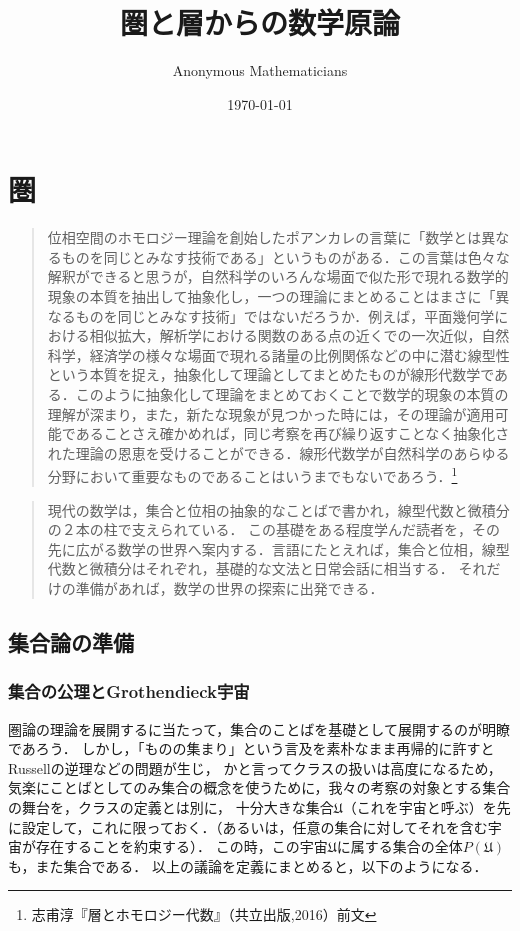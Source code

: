\documentclass[uplatex, dvipdfmx]{jsreport}
\title{圏と層からの数学原論}
\author{Anonymous Mathematicians}
\date{\today}
\begin{document}
\tableofcontents

\part{圏}

\begin{quotation}
    位相空間のホモロジー理論を創始したポアンカレの言葉に「数学とは異なるものを同じとみなす技術である」というものがある．この言葉は色々な解釈ができると思うが，自然科学のいろんな場面で似た形で現れる数学的現象の本質を抽出して抽象化し，一つの理論にまとめることはまさに「異なるものを同じとみなす技術」ではないだろうか．例えば，平面幾何学における相似拡大，解析学における関数のある点の近くでの一次近似，自然科学，経済学の様々な場面で現れる諸量の比例関係などの中に潜む線型性という本質を捉え，抽象化して理論としてまとめたものが線形代数学である．このように抽象化して理論をまとめておくことで数学的現象の本質の理解が深まり，また，新たな現象が見つかった時には，その理論が適用可能であることさえ確かめれば，同じ考察を再び繰り返すことなく抽象化された理論の恩恵を受けることができる．線形代数学が自然科学のあらゆる分野において重要なものであることはいうまでもないであろう．\footnote{志甫淳『層とホモロジー代数』（共立出版,2016）前文}
\end{quotation}
\begin{quotation}
    現代の数学は，集合と位相の抽象的なことばで書かれ，線型代数と微積分の２本の柱で支えられている．
    この基礎をある程度学んだ読者を，その先に広がる数学の世界へ案内する．言語にたとえれば，集合と位相，線型代数と微積分はそれぞれ，基礎的な文法と日常会話に相当する．
    それだけの準備があれば，数学の世界の探索に出発できる．
\end{quotation}

\chapter{集合論の準備}\label{chapter-settheory}

\section{集合の公理とGrothendieck宇宙}

圏論の理論を展開するに当たって，集合のことばを基礎として展開するのが明瞭であろう．
しかし，「ものの集まり」という言及を素朴なまま再帰的に許すとRussellの逆理などの問題が生じ，
かと言ってクラスの扱いは高度になるため，
気楽にことばとしてのみ集合の概念を使うために，我々の考察の対象とする集合の舞台を，クラスの定義とは別に，
十分大きな集合$\mathfrak{U}$（これを宇宙と呼ぶ）を先に設定して，これに限っておく．（あるいは，任意の集合に対してそれを含む宇宙が存在することを約束する）．
この時，この宇宙$\mathfrak{U}$に属する集合の全体$P(\mathfrak{U})$も，また集合である．
以上の議論を定義にまとめると，以下のようになる．
\end{document}
